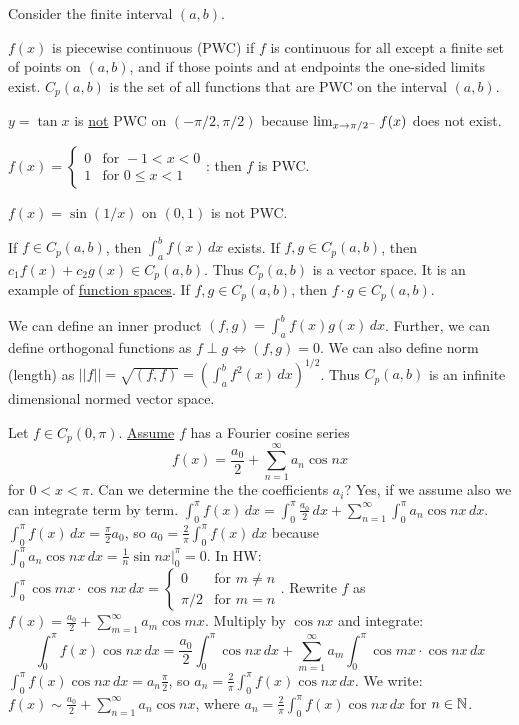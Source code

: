 \documentclass[]{article}
\begin{document}
Consider the finite interval $(a,b)$.
\begin{definition}
	$f(x)$ is piecewise continuous (PWC) if $f$ is continuous for all except a finite set of points on $(a,b)$, and if those points and at endpoints the one-sided limits exist. $C_p(a,b)$ is the set of all functions that are PWC on the interval $(a,b)$.
\end{definition}
\begin{example}
	$y=\tan x$ is \underline{not} PWC on $(-\pi/2,\pi/2)$ because $\lim_{x\rightarrow\pi/2^-}f(x)$ does  not exist.
\end{example}
\begin{example}
	$f(x)=\begin{cases}0 & \text{for }-1<x<0 \\ 1 & \text{for }0\leq x<1\end{cases}$: then $f$ is PWC.
\end{example}
\begin{example}
	$f(x)=\sin(1/x)$ on $(0,1)$ is not PWC.
\end{example}
\begin{note}
	If $f\in C_p(a,b)$, then $\int_a^bf(x) \, dx$ exists.
	If $f,g\in C_p(a,b)$, then $c_1f(x) + c_2 g(x) \in C_p(a,b)$.
	Thus $C_p(a,b)$ is a vector space. It is an example of \underline{function spaces}.
	If $f,g\in C_p(a,b)$, then $f\cdot g\in C_p(a,b)$.
\end{note}
We can define an inner product $(f,g)=\int_a^b f(x) g(x) \, dx$.
Further, we can define orthogonal functions as $f\perp g \iff (f,g)=0$.
We can also define norm (length) as $||f||=\sqrt{(f,f)}=\left(\int_a^b f^2(x) \, dx\right)^{1/2}$.
Thus $C_p(a,b)$ is an infinite dimensional normed vector space.

Let $f\in C_p(0,\pi)$. \underline{Assume} $f$ has a Fourier cosine series
\begin{equation}
f(x)=\frac{a_0}{2} + \sum_{n=1}^{\infty}a_n \cos{nx}
\end{equation}
for $0<x<\pi$.
Can we determine the the coefficients $a_i$? Yes, if we assume also we can integrate term by term.
$\int_0^\pi f(x) \, dx = \int_0^\pi \frac{a_0}{2} \, dx + \sum_{n=1}^{\infty} \int_0^\pi a_n \cos{nx} \, dx$. $\int_0^\pi f(x) \, dx = \frac{\pi}{2}a_0$, so $a_0 = \frac{2}{\pi} \int_0^\pi f(x) \, dx$ because $\int_0^\pi a_n \cos{nx} \, dx = \frac{1}{n} \sin{nx}\big\rvert_0^\pi=0$.
In HW: $\int_0^\pi\cos{mx}\cdot\cos{nx} \, dx = \begin{cases}0 & \text{for } m\neq n \\ \pi/2 & \text{for }m=n\end{cases}$.
Rewrite $f$ as $f(x)=\frac{a_0}{2}+\sum_{m=1}^\infty a_m \cos{mx}$. Multiply by $\cos{nx}$ and integrate:
$$\int_0^\pi f(x) \cos{nx} \, dx = \frac{a_0}{2}\int_0^\pi \cos{nx} \, dx + \sum_{m=1}^\infty a_m \int_0^\pi \cos{mx} \cdot \cos{nx} \, dx$$
$\int_0^\pi f(x) \cos{nx} \, dx = a_n \frac{\pi}{2}$, so $a_n = \frac{2}{\pi} \int_0^\pi f(x) \cos{nx} \, dx$.
We write: $f(x) \sim \frac{a_0}{2} + \sum_{n=1}^\infty a_n \cos{nx}$, where $a_n=\frac{2}{\pi} \int_0^\pi f(x)\cos{nx} \, dx$ for $n\in\mathbb{N}$.
\end{document}
